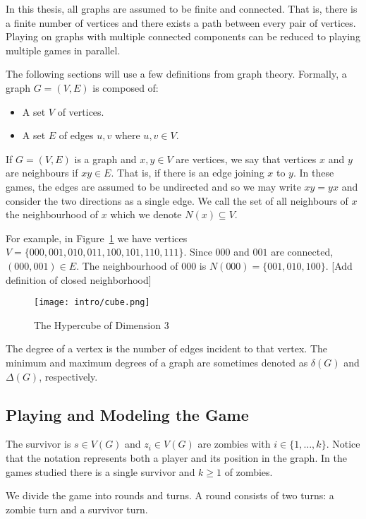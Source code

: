 
In this thesis, all graphs are assumed to be finite and connected. That is, there is a finite
number of vertices and there exists a path between every pair of vertices.
Playing on graphs with multiple connected components can be reduced to playing
multiple games in parallel.

The following sections will use a few definitions from graph theory.
Formally, a graph $G = (V, E)$ is composed of:

\begin{itemize}
\item A set $V$ of vertices.
\item A set $E$ of edges ${u,v}$ where $u, v \in V$.
\end{itemize}

If $G = (V,E)$ is a graph and $x,y \in V$ are vertices, we say that vertices $x$ and $y$ are neighbours if $xy \in E$.
That is, if there is an edge joining $x$ to $y$.
In these games, the edges are assumed to be undirected and so we may write $xy = yx$
and consider the two directions as a single edge.
We call the set of all neighbours of $x$ the neighbourhood of $x$ which we denote $N(x) \subseteq V$.

For example, in Figure~\ref{fig:hyper-cube} we have vertices $V = \{ 000, 001, 010, 011, 100, 101, 110, 111 \}$.
Since $000$ and $001$ are connected, $(000, 001) \in E$.
The neighbourhood of $000$ is $N(000) = \{ 001, 010, 100 \}$.
[Add definition of closed neighborhood]

\begin{figure}
\centering
\texttt{[image: intro/cube.png]}
\caption{The Hypercube of Dimension 3 \label{fig:hyper-cube}}
\end{figure}

The degree of a vertex is the number of edges incident to that vertex. The minimum and maximum
degrees of a graph are sometimes denoted as $\delta(G)$ and $\Delta(G)$, respectively.

\subsection{Playing and Modeling the Game}

The survivor is $s \in V(G)$ and $z_i \in V(G)$ are zombies with $i \in \{1, \dots, k\}$.
Notice that the notation represents both a player and its position in the graph.
In the games studied there is a single survivor and $k \geq 1$ of zombies.

We divide the game into rounds and turns. A round consists of two turns:
a zombie turn and a survivor turn.

